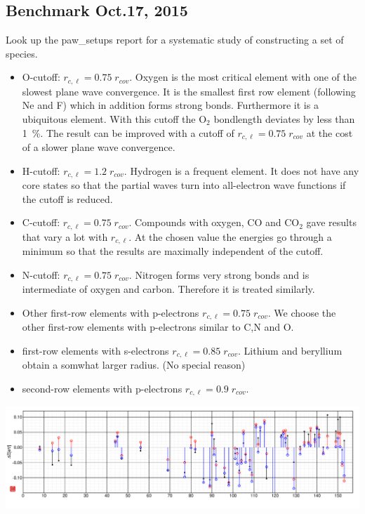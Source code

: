 \documentclass{book}
\begin{document}
\subsection*{Benchmark Oct.17, 2015}
Look up the paw\_setups report for a systematic study of constructing a
set of species.

\begin{itemize}
\item O-cutoff: $r_{c,\ell}=0.75\;r_{cov}$. Oxygen is the most
  critical element with one of the slowest plane wave convergence. It
  is the smallest first row element (following Ne and F) which in
  addition forms strong bonds. Furthermore it is a ubiquitous
  element. With this cutoff the O$_2$ bondlength deviates by less than
  1~\%. The result can be improved with a cutoff of
  $r_{c,\ell}=0.75\;r_{cov}$ at the cost of a slower plane wave
  convergence.
%
\item H-cutoff: $r_{c,\ell}=1.2\;r_{cov}$. Hydrogen is a frequent
  element. It does not have any core states so that the partial waves
  turn into all-electron wave functions if the cutoff is reduced.
%
\item C-cutoff: $r_{c,\ell}=0.75\;r_{cov}$. Compounds with oxygen, CO
  and CO$_2$ gave results that vary a lot with $r_{c,\ell}$. At the
  chosen value the energies go through a minimum so that the results
  are maximally independent of the cutoff.
%
\item N-cutoff: $r_{c,\ell}=0.75\;r_{cov}$. Nitrogen forms very strong
  bonds and is intermediate of oxygen and carbon. Therefore it is
  treated similarly.
%
\item Other first-row elements with p-electrons
  $r_{c,\ell}=0.75\;r_{cov}$.  We choose the other first-row elements
  with p-electrons similar to C,N and O.
%
\item first-row elements with s-electrons $r_{c,\ell}=0.85\;r_{cov}$.
  Lithium and beryllium obtain a somwhat larger radius. (No special reason)
%
\item second-row elements with p-electrons $r_{c,\ell}=0.9\;r_{cov}$.
\end{itemize}

\includegraphics[width=\linewidth]{Figs/151017_Benchmark/151017_benchmark}
\end{document}
